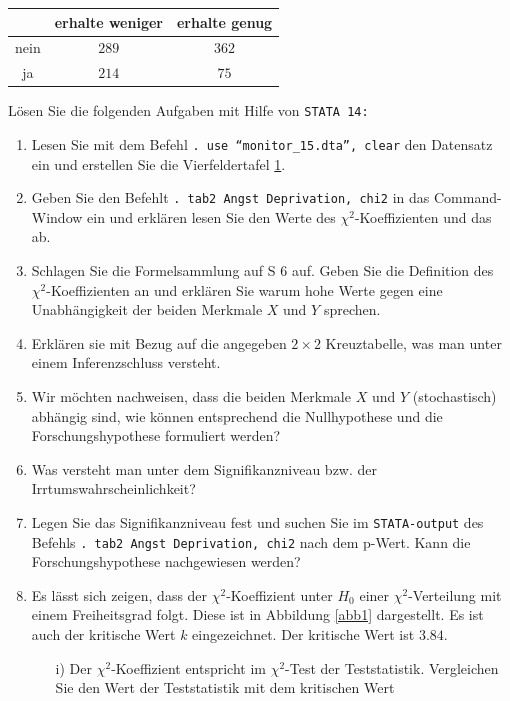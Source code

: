 \documentclass[11pt]{article}
\begin{document}
\begin{enumerate}
\begin{table}[ht]
\begin{center}
\begin{tabular}{|c|c|c|}
	\hline %
             & erhalte weniger   & erhalte genug  \\ \hline
        nein & $289$  & $362$                  \\ \hline
          ja & $214$  & $75$        \\ \hline
\end{tabular}
\end{center}
\label{depri_angst}
\end{table}
Lösen Sie die folgenden Aufgaben mit Hilfe von  \texttt{STATA 14:}
\begin{enumerate}
 \item {Lesen Sie mit dem Befehl \texttt{. use ``monitor\_15.dta'', clear} den Datensatz ein und erstellen  Sie die Vierfeldertafel \ref{depri_angst}.}
 \item{Geben Sie den Befehlt \texttt{. tab2 Angst Deprivation, chi2} in das Command-Window ein
 und erklären lesen Sie den Werte des $\chi^{2}$-Koeffizienten und das  ab.}
 \item{Schlagen Sie die Formelsammlung auf S 6 auf. Geben Sie die Definition des $\chi^{2}$-Koeffizienten an und erklären Sie warum hohe Werte gegen eine Unabhängigkeit der beiden
 Merkmale $X$ und $Y$ sprechen.}
 \item{Erklären sie mit Bezug auf die angegeben $2 \times 2$ Kreuztabelle, was man unter einem Inferenzschluss versteht. }
 \item{Wir möchten nachweisen, dass die beiden Merkmale $X$ und $Y$ (stochastisch) abhängig sind, wie können entsprechend die Nullhypothese
 und die Forschungshypothese formuliert werden?}%
 \item{Was versteht man unter dem Signifikanzniveau bzw. der Irrtumswahrscheinlichkeit?}
 \item{Legen Sie das Signifikanzniveau fest und suchen Sie im \texttt{STATA-output} des Befehls \texttt{. tab2 Angst Deprivation, chi2}
 nach dem p-Wert. Kann die Forschungshypothese nachgewiesen werden?}
 \item{Es lässt sich zeigen, dass der $\chi^{2}$-Koeffizient unter $H_{0}$ einer $\chi^{2}$-Verteilung mit einem Freiheitsgrad folgt. Diese ist in Abbildung
 \ref{abb1} dargestellt. Es ist auch der kritische Wert $k$ eingezeichnet. Der kritische Wert ist $3.84.$
 \begin{itemize}
 \item[i)]{Der  $\chi^{2}$-Koeffizient entspricht im  $\chi^{2}$-Test der Teststatistik. Vergleichen Sie den Wert der Teststatistik mit dem kritischen Wert 
}
\end{itemize}}
\end{enumerate}
\end{enumerate}
\end{document}
